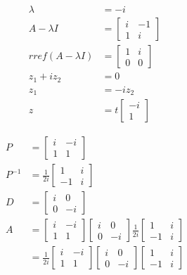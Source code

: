 \documentclass{article}
\theoremstyle{mytheoremstyle}
\theoremstyle{mytheoremstyle}
\theoremstyle{myproblemstyle}
\begin{document}
    \begin{align*}
        \lambda &= -i \\
        A-\lambda I &= \begin{bmatrix}
            i & -1 \\
            1 & i
        \end{bmatrix} \\
        rref(A-\lambda I) &= \begin{bmatrix}
            1 & i \\
            0 & 0
        \end{bmatrix} \\
        z_1 + iz_2 &= 0 \\
        z_1 &= -iz_2 \\
        z &= t \begin{bmatrix}
            -i \\ 1
        \end{bmatrix}
    \end{align*}

    \begin{align*}
        P &= \begin{bmatrix}
            i & -i \\
            1 & 1
        \end{bmatrix} \\
        P^{-1} &= \frac{1}{2i} \begin{bmatrix}
            1 & i \\
            -1 & i
        \end{bmatrix} \\
        D &= \begin{bmatrix}
            i & 0 \\
            0 & -i
        \end{bmatrix} \\
        A &= 
        \begin{bmatrix}
            i & -i \\
            1 & 1
        \end{bmatrix}
        \begin{bmatrix}
            i & 0 \\
            0 & -i
        \end{bmatrix}
        \frac{1}{2i} \begin{bmatrix}
            1 & i \\
            -1 & i
        \end{bmatrix} \\
        &= \frac{1}{2i}
        \begin{bmatrix}
            i & -i \\
            1 & 1
        \end{bmatrix}
        \begin{bmatrix}
            i & 0 \\
            0 & -i
        \end{bmatrix}
        \begin{bmatrix}
            1 & i \\
            -1 & i
        \end{bmatrix} \\
    \end{align*}
\end{document}
